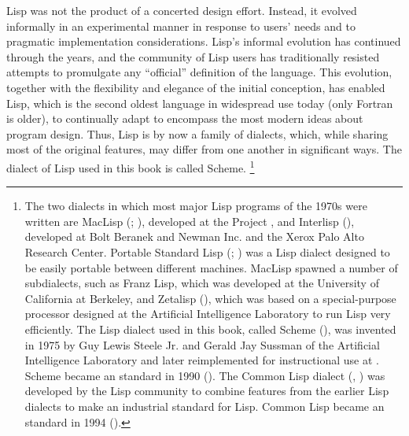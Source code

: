 Lisp was not the product of a concerted design effort.
Instead, it evolved informally in an experimental manner in response to users’ needs and to pragmatic implementation considerations.
Lisp’s informal evolution has continued through the years, and the community of Lisp users has traditionally resisted attempts to promulgate any “official” definition of the language.
This evolution, together with the flexibility and elegance of the initial conception, has enabled Lisp, which is the second oldest language in widespread use today (only Fortran is older), to continually adapt to encompass the most modern ideas about program design.
Thus, Lisp is by now a family of dialects, which, while sharing most of the original features, may differ from one another in significant ways.
The dialect of Lisp used in this book is called Scheme.%
\footnote{
	The two dialects in which most major Lisp programs of the 1970s were written are MacLisp (; ), developed at the  Project , and Interlisp (), developed at Bolt Beranek and Newman Inc. and the Xerox Palo Alto Research Center.
	Portable Standard Lisp (; ) was a Lisp dialect designed to be easily portable between different machines.
	MacLisp spawned a number of subdialects, such as Franz Lisp, which was developed at the University of California at Berkeley, and Zetalisp (), which was based on a special-purpose processor designed at the  Artificial Intelligence Laboratory to run Lisp very efficiently.
	The Lisp dialect used in this book, called Scheme (), was invented in 1975 by Guy Lewis Steele Jr. and Gerald Jay Sussman of the  Artificial Intelligence Laboratory and later reimplemented for instructional use at .
	Scheme became an  standard in 1990 ().
	The Common Lisp dialect (, ) was developed by the Lisp community to combine features from the earlier Lisp dialects to make an industrial standard for Lisp.
	Common Lisp became an  standard in 1994 ().
}

